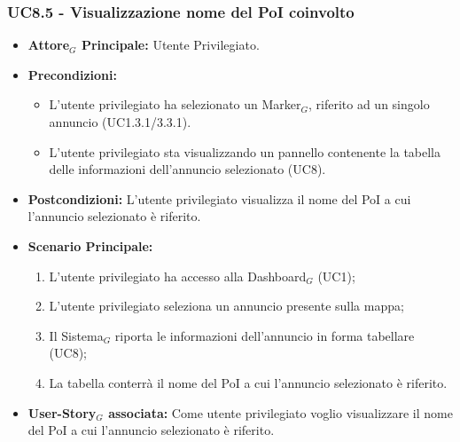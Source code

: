 \documentclass[10pt]{article}
\begin{document}
\begin{justify}
 \subsubsection{\textbf{UC8.5 - Visualizzazione nome del PoI coinvolto}}
 \begin{itemize}
     \item \textbf{Attore$_G$ Principale:} Utente Privilegiato.
     \item \textbf{Precondizioni:}
       \begin{itemize}
    	        \item L'utente privilegiato ha selezionato un Marker$_G$, riferito ad un singolo annuncio (UC1.3.1/3.3.1).
          \item L'utente privilegiato sta visualizzando un pannello contenente la tabella delle informazioni dell'annuncio selezionato (UC8).
       \end{itemize}
     \item \textbf{Postcondizioni:} L'utente privilegiato visualizza il nome del PoI a cui l'annuncio selezionato è riferito.
     \item \textbf{Scenario Principale:}
        \begin{enumerate}
            \item L'utente privilegiato ha accesso alla Dashboard$_G$ (UC1);
            \item L'utente privilegiato seleziona un annuncio presente sulla mappa;
            \item Il Sistema$_G$ riporta le informazioni dell'annuncio in forma tabellare (UC8);
            \item La tabella conterrà il nome del PoI a cui l'annuncio selezionato è riferito.
        \end{enumerate}
     \item \textbf{User-Story$_G$ associata:} Come utente privilegiato voglio visualizzare il nome del PoI a cui l'annuncio selezionato è riferito. 
 \end{itemize}

\end{justify}
\end{document}
